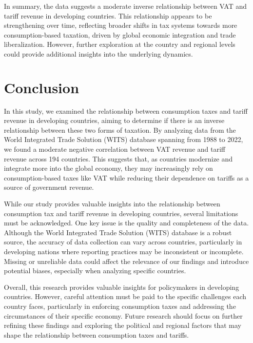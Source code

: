 \documentclass[12pt]{article}
\begin{document}
In summary, the data suggests a moderate inverse relationship between VAT and tariff revenue in developing countries. This relationship appears to be strengthening over time, reflecting broader shifts in tax systems towards more consumption-based taxation, driven by global economic integration and trade liberalization. However, further exploration at the country and regional levels could provide additional insights into the underlying dynamics.

\section{Conclusion}
\label{sec:conclusion}

In this study, we examined the relationship between consumption taxes and tariff revenue in developing countries, aiming to determine if there is an inverse relationship between these two forms of taxation. By analyzing data from the World Integrated Trade Solution (WITS) database spanning from 1988 to 2022, we found a moderate negative correlation between VAT revenue and tariff revenue across 194 countries. This suggests that, as countries modernize and integrate more into the global economy, they may increasingly rely on consumption-based taxes like VAT while reducing their dependence on tariffs as a source of government revenue.

While our study provides valuable insights into the relationship between consumption tax and tariff revenue in developing countries, several limitations must be acknowledged. One key issue is the quality and completeness of the data. Although the World Integrated Trade Solution (WITS) database is a robust source, the accuracy of data collection can vary across countries, particularly in developing nations where reporting practices may be inconsistent or incomplete. Missing or unreliable data could affect the relevance of our findings and introduce potential biases, especially when analyzing specific countries. 

Overall, this research provides valuable insights for policymakers in developing countries. However, careful attention must be paid to the specific challenges each country faces, particularly in enforcing consumption taxes and addressing the circumstances of their specific economy. Future research should focus on further refining these findings and exploring the political and regional factors that may shape the relationship between consumption taxes and tariffs.
\end{document}
